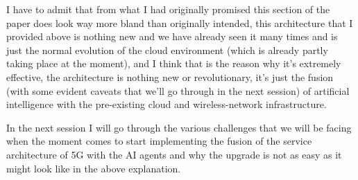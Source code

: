 I have to admit that from what I had originally promised this section of the paper does look way
more bland than originally intended, this architecture that I provided above is nothing new and we
have already seen it many times and is just the normal evolution of the cloud environment (which is
already partly taking place at the moment), and I think that is the reason why it's extremely
effective, the architecture is nothing new or revolutionary, it's just the fusion (with some evident
caveats that we'll go through in the next session) of artificial intelligence with the pre-existing
cloud and wireless-network infrastructure.

In the next session I will go through the various challenges that we will be facing when the moment
comes to start implementing the fusion of the service architecture of 5G with the AI agents and why
the upgrade is not as easy as it might look like in the above explanation.
